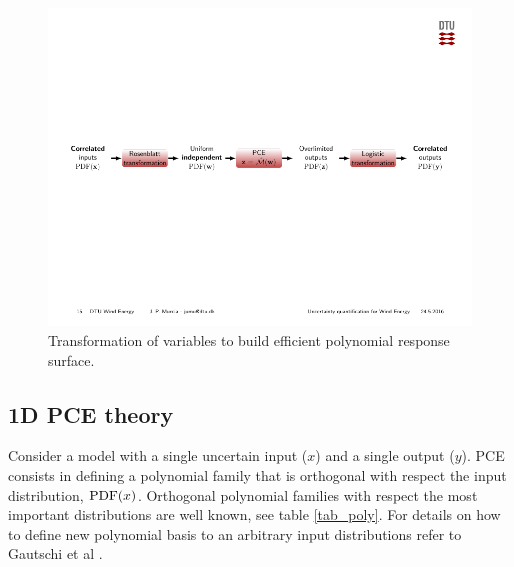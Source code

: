 \documentclass[preprint,12pt]{elsarticle}
\begin{document}

\begin{figure}[h!]
\begin{centering}
\includegraphics[width=\columnwidth]{Figures/2_transfromation_steps.pdf}
\caption{Transformation of variables to build efficient polynomial response surface.}
\label{fig_2_trans}
\end{centering}
\end{figure}


\subsection{1D PCE theory}


Consider a model with a single uncertain input ($x$) and a single output ($y$). PCE consists in defining a polynomial family that is orthogonal with respect the input distribution, $\mathrm{PDF}(x)$. Orthogonal polynomial families with respect the most important distributions are well known, see table \ref{tab_poly}. For details on how to define new polynomial basis to an arbitrary input distributions refer to Gautschi et al \cite{gautschi1994algorithm}.
\end{document}
